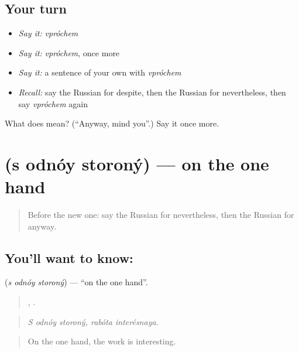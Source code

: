 \subsection*{Your turn}
\begin{itemize}
\raggedright
  \item \emph{Say it:} \emph{vpróchem}
  \item \emph{Say it:} \emph{vpróchem}, once more
  \item \emph{Say it:} a sentence of your own with \emph{vpróchem}
  \item \emph{Recall:} say the Russian for despite, then the Russian for nevertheless, then say \emph{vpróchem} again
\end{itemize}

\begin{tcolorbox}[breakable,colback=teal!4,colframe=teal!35!black,title={Before you move on}]
What does  mean? (\textquotedblleft{}Anyway, mind you\textquotedblright{}.) Say it once more.
\end{tcolorbox}
\section[\texorpdfstring{\ru{с} \ru{одной} \ru{стороны} (s odnóy storoný)}{с одной стороны (s odnóy storoný)}]{   (s odnóy storoný) — on the one hand}

\label{lesson:RU-C356-s-odnoy-storony}



\begin{quote}
Before the new one: say the Russian for nevertheless, then the Russian for anyway.
\end{quote}

\subsection*{You'll want to know:   }
\textbf{  } (\emph{s odnóy storoný}) — \textquotedblleft{}on the one hand\textquotedblright{}.

\begin{quote}
  ,  .
\end{quote}

\begin{quote}
\emph{S odnóy storoný, rabóta interésnaya.}
\end{quote}

\begin{quote}
On the one hand, the work is interesting.
\end{quote}

